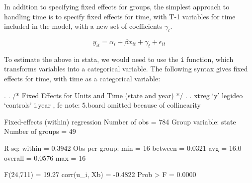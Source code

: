 \documentclass[12pt]{article}
\begin{document}
In addition to specifying fixed effects for groups, the simplest
approach to handling time is to specify fixed effects for time, with
T-1 variables for time included in the model, with a new set of
coefficients $\gamma_t$. 

\begin{equation*}
  \label{eq:fe-time}
  y_{it}=\alpha_i+ \beta x_{it} + \gamma_t + \epsilon_{it}
\end{equation*}

To estimate the above in stata, we would need to use the \texttt{i}
function, which transforms variables into a categorical variable. The
following syntax gives fixed effects for time, with time as a
categorical variable:

\begin{stlog}
 
. 
. /* Fixed Effects for Units and Time (state and year) */
. 
.  xtreg `y' legideo  `controls'  i.year , fe
note: 5.board omitted because of collinearity

Fixed-effects (within) regression               Number of obs      =       784
Group variable: state                           Number of groups   =        49

R-sq:  within  = 0.3942                         Obs per group: min =        16
       between = 0.0321                                        avg =      16.0
       overall = 0.0576                                        max =        16

                                                F(24,711)          =     19.27
corr(u_i, Xb)  = -0.4822                        Prob > F           =    0.0000


\end{stlog}
\end{document}
